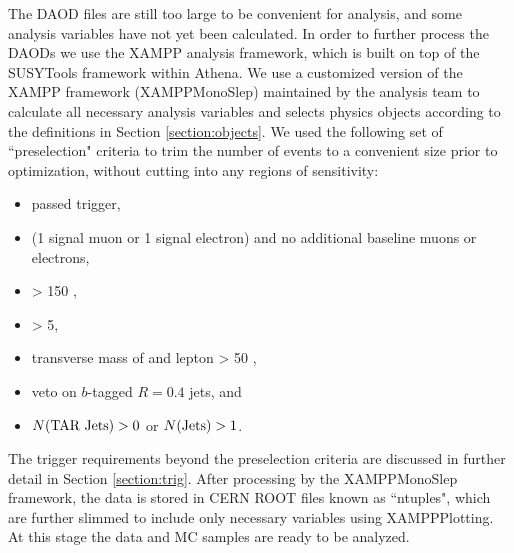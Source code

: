 The DAOD files are still too large to be convenient for analysis, and some analysis variables have not yet been calculated. In order to further process the DAODs we use the XAMPP analysis framework, which is built on top of the SUSYTools framework within Athena. We use a customized version of the XAMPP framework (XAMPPMonoSlep) maintained by the analysis team to calculate all necessary analysis variables and selects physics objects according to the definitions in Section \ref{section:objects}. We used the following set of ``preselection" criteria to trim the number of events to a convenient size prior to optimization, without cutting into any regions of sensitivity:
\begin{itemize}
\item passed \met trigger,
\item (1 signal muon or 1 signal electron) and no additional baseline muons or electrons,
\item \met > 150 \GeV,
\item \metsig > 5,
\item transverse mass of \met and lepton \mtlepmet > 50 \GeV,
\item veto on $b$-tagged $R=0.4$ jets, and
\item \(N (\text{TAR Jets}) > 0\) or \(N (\text{Jets}) > 1\).
\end{itemize}

The trigger requirements beyond the preselection criteria are discussed in further detail in Section \ref{section:trig}.  After processing by the XAMPPMonoSlep framework, the data is stored in CERN ROOT files known as ``ntuples", which are further slimmed to include only necessary variables using XAMPPPlotting. At this stage the data and MC samples are ready to be analyzed.

